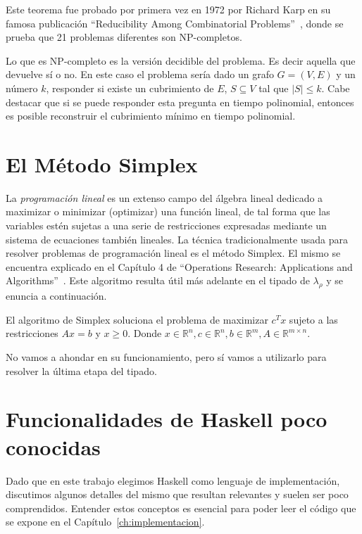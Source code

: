 Este teorema fue probado por primera vez en 1972 por Richard Karp en su famosa publicación ``Reducibility Among Combinatorial Problems''~\cite{cover_np}, donde se prueba que 21 problemas diferentes son NP-completos.

\begin{observacion}
    Lo que es NP-completo es la versión decidible del problema. Es decir aquella que devuelve sí o no. En este caso el problema sería dado un grafo $G=(V,E)$ y un número $k$, responder si existe un cubrimiento de $E$, $S \subseteq V$ tal que $|S|\leq k$. Cabe destacar que si se puede responder esta pregunta en tiempo polinomial, entonces es posible reconstruir el cubrimiento mínimo en tiempo polinomial.
\end{observacion}

\section{El Método Simplex}\label{sec:simplex}

La \emph{programación lineal} es un extenso campo del álgebra lineal dedicado a maximizar o minimizar (optimizar) una función lineal, de tal forma que las variables estén sujetas a una serie de restricciones expresadas mediante un sistema de ecuaciones también lineales. La técnica tradicionalmente usada para resolver problemas de programación lineal es el método Simplex. El mismo se encuentra explicado en el Capítulo 4 de ``Operations Research: Applications and Algorithms''~\cite{simplex}. Este algoritmo resulta útil más adelante en el tipado de $\lambda_\rho$ y se enuncia a continuación.

\begin{definicion}\label{def:simplex}
    El algoritmo de Simplex soluciona el problema de maximizar $c^T x$ sujeto a las restricciones $Ax=b$ y $x\geq 0$. Donde $x\in \mathbb{R}^n, c\in \mathbb{R}^n, b\in \mathbb{R}^m, A\in \mathbb{R}^{m\times n}$.
\end{definicion}

No vamos a ahondar en su funcionamiento, pero sí vamos a utilizarlo para resolver la última etapa del tipado.

\section{Funcionalidades de Haskell poco conocidas}

Dado que en este trabajo elegimos Haskell como lenguaje de implementación, discutimos algunos detalles del mismo que resultan relevantes y suelen ser poco comprendidos. Entender estos conceptos es esencial para poder leer el código que se expone en el Capítulo~\ref{ch:implementacion}.


